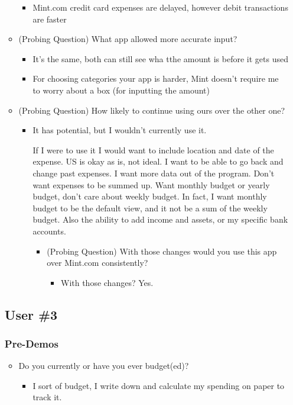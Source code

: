 \documentclass{chi2011}
\begin{document}
\begin{itemize}[noitemsep]
\begin{itemize}[noitemsep]
\begin{itemize}[noitemsep]
			\item Mint.com credit card expenses are delayed, however debit transactions are faster
		\end{itemize}
	\item (Probing Question) What app allowed more accurate input?
		\begin{itemize}[noitemsep]
			\item It's the same,  both can still see wha tthe amount is before it gets used
			\item For choosing categories your app is harder, Mint doesn't require me to worry about a
				  box (for inputting the amount)
		\end{itemize}
	\item (Probing Question) How likely to continue using ours over the other one?
		\begin{itemize}[noitemsep]
			\item It has potential, but I wouldn't currently use it.

				  If I were to use it I would want to include location and date of the expense. US is 
				  okay as is, not ideal. I want to be able to go back and change past expenses. I want
				  more data out of the program. Don't want expenses to be summed up. Want monthly budget
				  or yearly budget, don't care about weekly budget. In fact, I want monthly budget to be 
				  the default view, and it not be a sum of the weekly budget. Also the ability to add 
				  income and assets, or my specific bank accounts. 
			\begin{itemize}[noitemsep]
				\item (Probing Question) With those changes would you use this app over Mint.com 
					  consistently? 
				\begin{itemize}[noitemsep]
					\item With those changes? Yes.
				\end{itemize}
			\end{itemize}
		\end{itemize}
	\end{itemize}
	
	
	\subsection{User \#3}
	\subsubsection{Pre-Demos}
	\begin{itemize}[noitemsep]
		\item Do you currently or have you ever budget(ed)?
		\begin{itemize}[noitemsep]
			\item I sort of budget, I write down and calculate my spending on
				paper to track it. 
		\end{itemize}
	\end{itemize}
	

\end{itemize}
\end{document}

